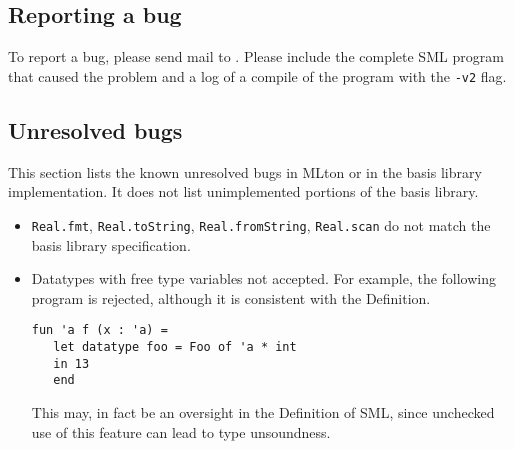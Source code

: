 
\subsection{Reporting a bug}

To report a bug, please send mail to {\mltonmail}.  Please include the
complete SML program that caused the problem and a log of a compile of
the program with the {\tt -v2} flag.

\subsection{Unresolved bugs}

This section lists the known unresolved bugs in MLton or in the basis
library implementation.  It does not list unimplemented portions of
the basis library.

\begin{itemize}

\item
{\tt Real.fmt}, {\tt Real.toString}, {\tt Real.fromString},
{\tt Real.scan}
do not match the basis library specification.

\item
Datatypes with free type variables not accepted.  For example,
the following program is rejected, although it is consistent with the
Definition.
\begin{verbatim}
fun 'a f (x : 'a) =
   let datatype foo = Foo of 'a * int
   in 13
   end
\end{verbatim}
This may, in fact be an oversight in the Definition of SML, since
unchecked use of this feature can lead to type unsoundness.

\end{itemize}
